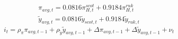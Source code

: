 \begin{align}
    \pi_{avg, t} = 0.0816 \pi^{scot}_{H,t} + 0.9184 \pi^{ruk}_{H,t} \\
    \tilde{y}_{avg, t} = 0.0816 \tilde{y}_{scot, t} + 0.9184 \tilde{y}_{ruk, t}
\end{align}
\begin{equation}
    i_t = \rho_{\pi}\pi_{avg, t-1} + \rho_{\tilde y}\tilde{y}_{avg, t-1} + \Delta  \pi_{avg, t-1} + \Delta \tilde{y}_{avg, t-1} + \nu_t
\end{equation}

